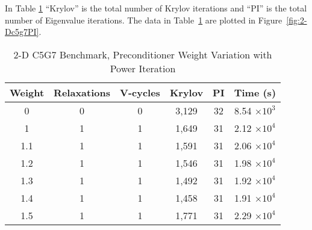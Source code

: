In Table \ref{table:2-D c5g7} ``Krylov'' is the total number of Krylov iterations and ``PI'' is the total number of Eigenvalue iterations. The data in Table~\ref{table:2-D c5g7} are plotted in Figure~\ref{fig:2-Dc5g7PI}.
%
\begin{table}[!h]
\caption{2-D C5G7 Benchmark, Preconditioner Weight Variation with Power Iteration}
\begin{center}
\begin{tabular}{c c c c c c}
\hline
Weight & Relaxations & V-cycles & Krylov & PI & Time (s) \\[0.5ex]
\hline
0    & 0 & 0 & 3,129 & 32 & 8.54 $\times 10^{3}$ \\
1    & 1 & 1 & 1,649 & 31 & 2.12 $\times 10^{4}$ \\
1.1 & 1 & 1 & 1,591 & 31 & 2.06 $\times 10^{4}$ \\
1.2 & 1 & 1 & 1,546 & 31 & 1.98 $\times 10^{4}$ \\
1.3 & 1 & 1 & 1,492 & 31 & 1.92 $\times 10^{4}$ \\
1.4 & 1 & 1 & 1,458 & 31 & 1.91 $\times 10^{4}$ \\
1.5 & 1 & 1 & 1,771 & 31 & 2.29 $\times 10^{4}$ \\
\hline 
\end{tabular} 
\end{center}
\label{table:2-D c5g7}
\end{table}

